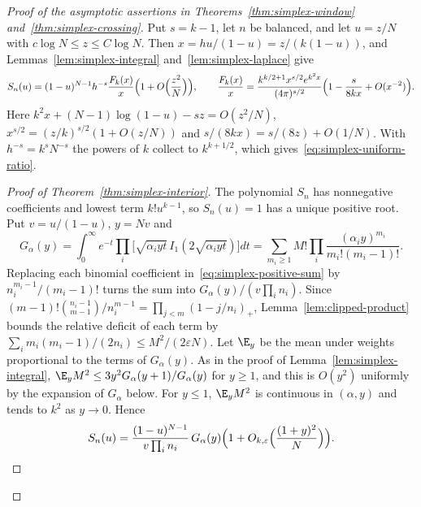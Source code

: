 \begin{proof}[Proof of the asymptotic assertions in
Theorems~\ref{thm:simplex-window} and~\ref{thm:simplex-crossing}]
Put $s=k-1$, let $n$ be balanced, and let $u=z/N$ with $c\log N\le z\le C\log N$.
Then $x=hu/(1-u)=z/(k(1-u))$, and Lemmas~\ref{lem:simplex-integral}
and~\ref{lem:simplex-laplace} give
\[
S_n(u)=(1-u)^{N-1}h^{-s}\frac{F_k(x)}x\Bigl(1+O\Bigl(\frac{z^2}N\Bigr)\Bigr),
\qquad
\frac{F_k(x)}x=\frac{k^{k/2+1}x^{s/2}e^{k^2x}}{(4\pi)^{s/2}}
\Bigl(1-\frac s{8kx}+O(x^{-2})\Bigr).
\]
Here $k^2x+(N-1)\log(1-u)-sz=O(z^2/N)$, $x^{s/2}=(z/k)^{s/2}(1+O(z/N))$ and
$s/(8kx)=s/(8z)+O(1/N)$. With $h^{-s}=k^sN^{-s}$ the powers of $k$ collect to
$k^{k+1/2}$, which gives~\eqref{eq:simplex-uniform-ratio}.


\begin{proof}[Proof of Theorem~\ref{thm:simplex-interior}]
The polynomial $S_n$ has nonnegative coefficients and lowest term $k!u^{k-1}$,
so $S_n(u)=1$ has a unique positive root. Put $v=u/(1-u)$, $y=Nv$ and
\[
G_\alpha(y)=\int_0^\infty e^{-t}\prod_i\bigl[\sqrt{\alpha_iyt}\,
I_1(2\sqrt{\alpha_iyt})\bigr]dt
=\sum_{m_i\ge1}M!\prod_i\frac{(\alpha_iy)^{m_i}}{m_i!(m_i-1)!}.
\]
Replacing each binomial coefficient in~\eqref{eq:simplex-positive-sum} by
$n_i^{m_i-1}/(m_i-1)!$ turns the sum into $G_\alpha(y)/(v\prod_in_i)$. Since
$(m-1)!\binom{n_i-1}{m-1}/n_i^{m-1}=\prod_{j<m}(1-j/n_i)_+$,
Lemma~\ref{lem:clipped-product} bounds the relative deficit of each term by
$\sum_im_i(m_i-1)/(2n_i)\le M^2/(2\varepsilon N)$. Let $\E_y$ be the mean under
weights proportional to the terms of $G_\alpha(y)$. As in the proof of
Lemma~\ref{lem:simplex-integral}, $\E_yM^2\le3y^2G_\alpha(y+1)/G_\alpha(y)$ for
$y\ge1$, and this is $O(y^2)$ uniformly by the expansion of $G_\alpha$ below. For
$y\le1$, $\E_yM^2$ is continuous in $(\alpha,y)$ and tends to $k^2$ as $y\to0$.
Hence
\[
S_n(u)=\frac{(1-u)^{N-1}}{v\prod_in_i}\,G_\alpha(y)
\Bigl(1+O_{k,\varepsilon}\Bigl(\frac{(1+y)^2}N\Bigr)\Bigr).
\]


\end{proof}
\end{proof}
